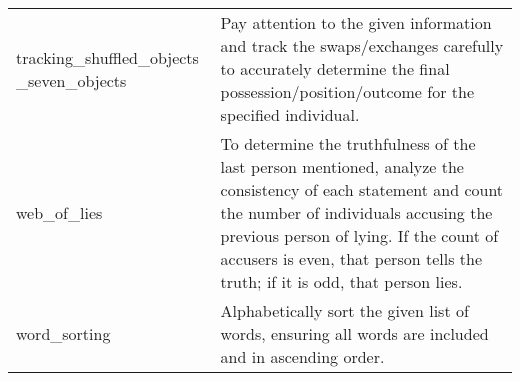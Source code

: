 \begin{table}[H]
\begin{center}
\begin{tabular}{P{2.3cm}P{11.6cm}}
tracking\_shuffled\_objects \_seven\_objects & Pay attention to the given information and track the swaps/exchanges carefully to accurately determine the final possession/position/outcome for the specified individual. \\ [2ex]
web\_of\_lies & To determine the truthfulness of the last person mentioned, analyze the consistency of each statement and count the number of individuals accusing the previous person of lying. If the count of accusers is even, that person tells the truth; if it is odd, that person lies. \\ [2ex]
word\_sorting & Alphabetically sort the given list of words, ensuring all words are included and in ascending order. \\ [2ex]

\bottomrule
\end{tabular}
\end{center}
\label{table:found_instructions_on_bbh_tasks_s_text_bison_o_gpt_3.5_turbo_from_empty}
\end{table}

